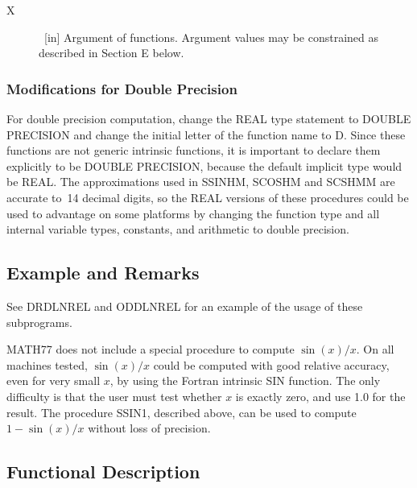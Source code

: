 \documentclass[twoside]{MATH77}
\begin{document}
\begin{description}

\item[X] \ [in] Argument of functions. Argument values may be constrained as
described in Section E below.
\end{description}

\subsubsection{Modifications for Double Precision}

For double precision computation, change the REAL type statement to DOUBLE
PRECISION and change the initial letter of the function name to D. Since
these functions are not generic intrinsic functions, it is important to
declare them explicitly to be DOUBLE PRECISION, because the default implicit
type would be REAL. The approximations used in SSINHM, SCOSHM and SCSHMM are
accurate to~14 decimal digits, so the REAL versions of these procedures
could be used to advantage on some platforms by changing the function type
and all internal variable types, constants, and arithmetic to double
precision.

\subsection{Example and Remarks}

See DRDLNREL and ODDLNREL for an example of the usage of these subprograms.

MATH77 does not include a special procedure to compute $\sin (x)/x$. On all
machines tested, $\sin (x)/x$ could be computed with good relative accuracy,
even for very small $x$, by using the Fortran intrinsic SIN function. The
only difficulty is that the user must test whether $x$ is exactly zero, and
use 1.0 for the result. The procedure SSIN1, described above, can be used to
compute $1-\sin (x)/x$ without loss of precision.

\subsection{Functional Description}
\end{document}
